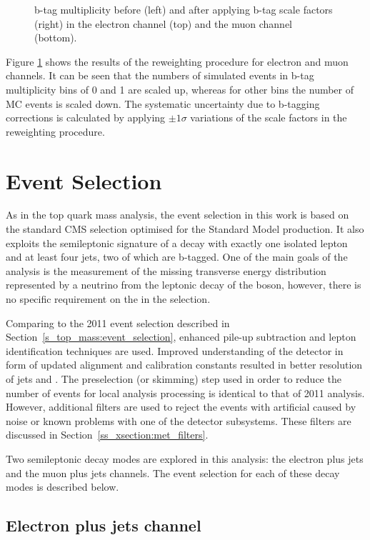 \begin{figure}[!htpb]
	\caption{\label{fig:bjet_weights}
    b-tag multiplicity before (left) and after applying b-tag scale factors (right) in the electron channel (top) and
    the muon channel (bottom).}
\end{figure}

Figure \ref{fig:bjet_weights} shows the results of the reweighting procedure for electron and muon channels. It can be
seen that the numbers of simulated events in b-tag multiplicity bins of \num{0} and \num{1} are scaled up, whereas for
other bins the number of MC events is scaled down. The systematic uncertainty due to b-tagging corrections is calculated
by applying $\pm 1 \sigma$ variations of the scale factors in the reweighting procedure.

\section{Event Selection}
\label{s_xsection:event_selection}
As in the top quark mass analysis, the event selection in this work is based on the standard CMS selection optimised for
the Standard Model \ttbar production. It also exploits the semileptonic signature of a \ttbar decay with exactly one
isolated lepton and at least four jets, two of which are b-tagged. One of the main goals of the analysis is the
measurement of the missing transverse energy distribution represented by a neutrino from the leptonic decay of the \W
boson, however, there is no specific requirement on the \MET in the selection.

Comparing to the 2011 event selection described in Section~\ref{s_top_mass:event_selection}, enhanced pile-up
subtraction and lepton identification techniques are used. Improved understanding of the detector in form of updated
alignment and calibration constants resulted in better resolution of jets and \MET. The preselection (or skimming) step
used in order to reduce the number of events for local analysis processing is identical to that of 2011 analysis.
However, additional filters are used to reject the events with artificial \MET caused by noise or known problems with
one of the detector subsystems. These filters are discussed in Section~\ref{ss_xsection:met_filters}.

Two semileptonic \ttbar decay modes are explored in this analysis: the electron plus jets and the muon plus jets
channels. The event selection for each of these decay modes is described below.

\subsection{Electron plus jets channel}
\label{ss_xsection:ejets}

